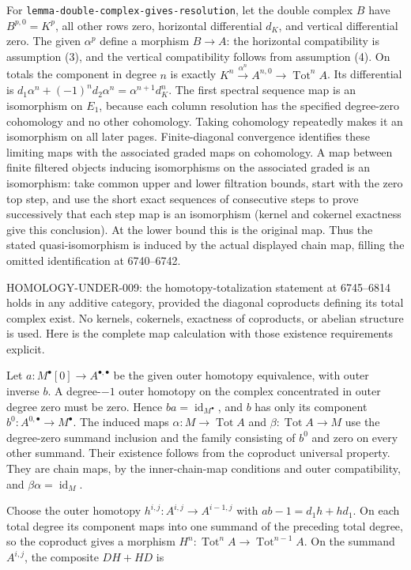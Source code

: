 For \texttt{lemma-double-complex-gives-resolution}, let the double complex \(B\) have \(B^{p,0}=K^p\), all other rows zero, horizontal differential \(d_K\), and vertical differential zero. The given \(\alpha^p\) define a morphism \(B\to A\): the horizontal compatibility is assumption (3), and the vertical compatibility follows from assumption (4). On totals the component in degree \(n\) is exactly \(K^n\xrightarrow{\alpha^n}A^{n,0}\to\operatorname{Tot}^nA\). Its differential is \(d_1\alpha^n+(-1)^n d_2\alpha^n
=\alpha^{n+1}d_K^n\). The first spectral sequence map is an isomorphism on \(E_1\), because each column resolution has the specified degree-zero cohomology and no other cohomology. Taking cohomology repeatedly makes it an isomorphism on all later pages. Finite-diagonal convergence identifies these limiting maps with the associated graded maps on cohomology. A map between finite filtered objects inducing isomorphisms on the associated graded is an isomorphism: take common upper and lower filtration bounds, start with the zero top step, and use the short exact sequences of consecutive steps to prove successively that each step map is an isomorphism (kernel and cokernel exactness give this conclusion). At the lower bound this is the original map. Thus the stated quasi-isomorphism is induced by the actual displayed chain map, filling the omitted identification at 6740--6742.

HOMOLOGY-UNDER-009: the homotopy-totalization statement at 6745--6814 holds in any additive category, provided the diagonal coproducts defining its total complex exist. No kernels, cokernels, exactness of coproducts, or abelian structure is used. Here is the complete map calculation with those existence requirements explicit.

Let \(a:M^\bullet[0]\to A^{\bullet,\bullet}\) be the given outer homotopy equivalence, with outer inverse \(b\). A degree-\(-1\) outer homotopy on the complex concentrated in outer degree zero must be zero. Hence \(ba=\operatorname{id}_{M^\bullet}\), and \(b\) has only its component \(b^0:A^{0,\bullet}\to M^\bullet\). The induced maps \(\alpha:M\to\operatorname{Tot}A\) and \(\beta:\operatorname{Tot}A\to M\) use the degree-zero summand inclusion and the family consisting of \(b^0\) and zero on every other summand. Their existence follows from the coproduct universal property. They are chain maps, by the inner-chain-map conditions and outer compatibility, and \(\beta\alpha=\operatorname{id}_M\).

Choose the outer homotopy \(h^{i,j}:A^{i,j}\to A^{i-1,j}\) with \(ab-1=d_1h+hd_1\). On each total degree its component maps into one summand of the preceding total degree, so the coproduct gives a morphism \(H^n:\operatorname{Tot}^nA\to\operatorname{Tot}^{n-1}A\). On the summand \(A^{i,j}\), the composite \(DH+HD\) is

